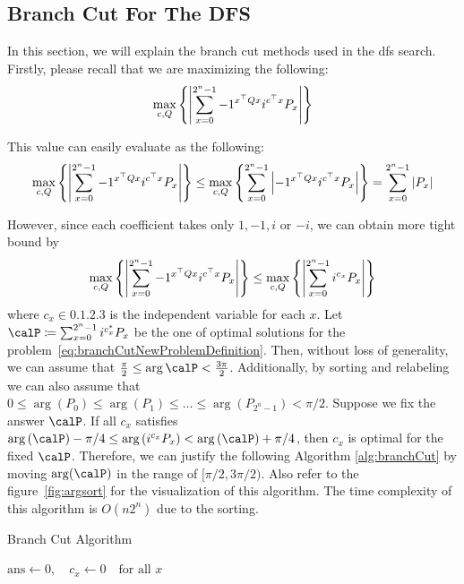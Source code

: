 \documentclass[\main/main]{subfiles}
\begin{document}
\subsection{Branch Cut For The DFS}

In this section, we will explain the branch cut methods used in the dfs search.
Firstly, please recall that we are maximizing the following:
\begin{equation*}
  \max_{c,Q} \qty{ \abs{\sum_{x=0}^{2^n-1} -1^{x^\top Q x} i^{c^\top x} P_x} }
\end{equation*}

This value can easily evaluate as the following:
\begin{equation*}
  \max_{c,Q} \qty{ \abs{\sum_{x=0}^{2^n-1} -1^{x^\top Q x} i^{c^\top x} P_x} }
  \leq \max_{c,Q} \qty{ \sum_{x=0}^{2^n-1} \abs{-1^{x^\top Q x} i^{c^\top x} P_x} }
  = \sum_{x=0}^{2^n-1} \abs{P_x}
\end{equation*}

However, since each coefficient takes only $1, -1, i$ or $-i$,
we can obtain more tight bound by
\begin{equation}\label{eq:branchCutNewProblemDefinition}
  \max_{c,Q} \qty{ \abs{\sum_{x=0}^{2^n-1} -1^{x^\top Q x} i^{c^\top x} P_x} }
  \leq \max_{c,Q} \qty{ \abs{\sum_{x=0}^{2^n-1} i^{c_x} P_x} }
\end{equation}
where $c_x \in \qty{0, 1, 2, 3}$ is the independent variable for each $x$.
Let $\calP \defeq \sum_{x=0}^{2^n-1} i^{c_x^*} P_x$ be
the one of optimal solutions for the problem~\eqref{eq:branchCutNewProblemDefinition}.
Then, without loss of generality,
we can assume that $\frac{\pi}{2} \leq \arg \calP < \frac{3\pi}{2}$.
Additionally, by sorting and relabeling we can also assume that
$0 \leq \arg{(P_0)} \leq \arg{(P_1)} \leq \dots \leq \arg{(P_{2^n-1})} < \pi/2$.
Suppose we fix the answer $\calP$.
If all $c_x$ satisfies $\arg{(\calP)} - \pi/4 \leq \arg{\qty(i^{c_x} P_x)} < \arg{(\calP)} + \pi/4$,
then $c_x$ is optimal for the fixed $\calP$.
Therefore, we can justify the following Algorithm \ref{alg:branchCut}
by moving $\arg(\calP)$ in the range of $[\pi/2, 3\pi/2)$.
Also refer to the figure~\ref{fig:argsort} for the visualization of this algorithm.
The time complexity of this algorithm is $O(n2^n)$ due to the sorting.

\begin{algorithm}
  \caption{Branch Cut Algorithm}
  \label{alg:branchCut}
  $\mathrm{ans} \leftarrow 0, \quad c_x \leftarrow 0 \quad \text{for all } x$\;
\end{algorithm}
\end{document}
